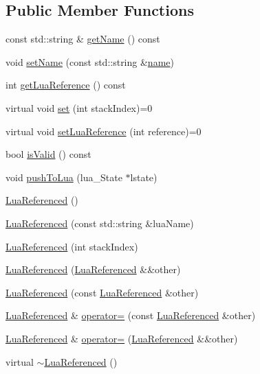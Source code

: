 \subsection*{Public Member Functions}
\begin{DoxyCompactItemize}
\item 
const std\+::string \& \hyperlink{classZeta_1_1LuaReferenced_a8a1cc4ca0f13f9523957c4b5a406f8de}{get\+Name} () const 
\item 
void \hyperlink{classZeta_1_1LuaReferenced_a221f63ccf254251ccb97b6f6acfe800c}{set\+Name} (const std\+::string \&\hyperlink{classZeta_1_1LuaReferenced_ad6f7a947b37382f9968f4a54bd718119}{name})
\item 
int \hyperlink{classZeta_1_1LuaReferenced_a848feb700634411658791251023970ea}{get\+Lua\+Reference} () const 
\item 
virtual void \hyperlink{classZeta_1_1LuaReferenced_a9b61c3cb2dde8a50d1c463dfe7df146c}{set} (int stack\+Index)=0
\item 
virtual void \hyperlink{classZeta_1_1LuaReferenced_a8e487b719107baad17268854b878fc81}{set\+Lua\+Reference} (int reference)=0
\item 
bool \hyperlink{classZeta_1_1LuaReferenced_a25a6e3458bed7bfd4ac1d7a24d1a8278}{is\+Valid} () const 
\item 
void \hyperlink{classZeta_1_1LuaReferenced_adac9c2f2ad3aafa4e0b6d193075dca76}{push\+To\+Lua} (lua\+\_\+\+State $\ast$lstate)
\item 
\hyperlink{classZeta_1_1LuaReferenced_a55b255c116050cb7610abcc53ce67a3a}{Lua\+Referenced} ()
\item 
\hyperlink{classZeta_1_1LuaReferenced_ab57ebe8c68b61fae88b3eef4b92582ce}{Lua\+Referenced} (const std\+::string \&lua\+Name)
\item 
\hyperlink{classZeta_1_1LuaReferenced_aac7ce73e71472d0eab8f0a74d7ee7e3a}{Lua\+Referenced} (int stack\+Index)
\item 
\hyperlink{classZeta_1_1LuaReferenced_a98910517c18314f6f7d53fd6b758e9a8}{Lua\+Referenced} (\hyperlink{classZeta_1_1LuaReferenced}{Lua\+Referenced} \&\&other)
\item 
\hyperlink{classZeta_1_1LuaReferenced_a19e872857191135725c0f37e6fa8745e}{Lua\+Referenced} (const \hyperlink{classZeta_1_1LuaReferenced}{Lua\+Referenced} \&other)
\item 
\hyperlink{classZeta_1_1LuaReferenced}{Lua\+Referenced} \& \hyperlink{classZeta_1_1LuaReferenced_abf192c4b4fd21769bc026fed3a44c9a5}{operator=} (const \hyperlink{classZeta_1_1LuaReferenced}{Lua\+Referenced} \&other)
\item 
\hyperlink{classZeta_1_1LuaReferenced}{Lua\+Referenced} \& \hyperlink{classZeta_1_1LuaReferenced_a7d4a40188fbf14f638d88891efebf167}{operator=} (\hyperlink{classZeta_1_1LuaReferenced}{Lua\+Referenced} \&\&other)
\item 
virtual \hyperlink{classZeta_1_1LuaReferenced_abaac777edfe7db27ed63020b976e5362}{$\sim$\+Lua\+Referenced} ()
\end{DoxyCompactItemize}

